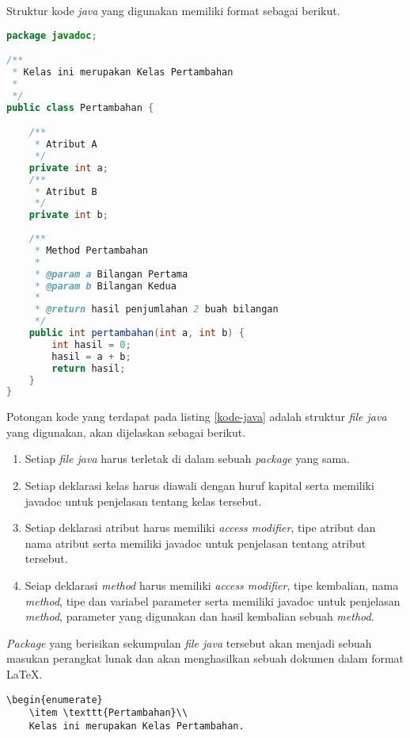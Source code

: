 \documentclass[a4paper,twoside]{article}
\begin{document}
\begin{enumerate}
\begin{enumerate}
Struktur kode {\it java} yang digunakan memiliki format sebagai berikut.

\begin{lstlisting}[language=Java, caption=Potongan kode {\it java}, label={kode-java}]
package javadoc;

/**
 * Kelas ini merupakan Kelas Pertambahan
 *
 */
public class Pertambahan {

    /**
     * Atribut A
     */
    private int a;
    /**
     * Atribut B
     */
    private int b;
    
    /**
     * Method Pertambahan
     *
     * @param a Bilangan Pertama
     * @param b Bilangan Kedua
     * 
     * @return hasil penjumlahan 2 buah bilangan
     */
    public int pertambahan(int a, int b) {
        int hasil = 0;
        hasil = a + b;
        return hasil;
    }
}
\end{lstlisting}

Potongan kode yang terdapat pada listing \ref{kode-java} adalah struktur {\it file java} yang digunakan, akan dijelaskan sebagai berikut.

\begin{enumerate}
	\item Setiap {\it file java} harus terletak di dalam sebuah {\it package} yang sama.
	\item Setiap deklarasi kelas harus diawali dengan huruf kapital serta memiliki javadoc untuk penjelasan tentang kelas tersebut.
	\item Setiap deklarasi atribut harus memiliki {\it access modifier}, tipe atribut dan nama atribut serta memiliki javadoc untuk penjelasan tentang atribut tersebut.
	\item Seiap deklarasi {\it method} harus memiliki {\it access modifier}, tipe kembalian, nama {\it method}, tipe dan variabel parameter serta memiliki javadoc untuk penjelasan {\it method}, parameter yang digunakan dan hasil kembalian sebuah {\it method}.
\end{enumerate}

{\it Package} yang berisikan sekumpulan {\it file java} tersebut akan menjadi sebuah masukan perangkat lunak dan akan menghasilkan sebuah dokumen dalam format \LaTeX.

\begin{lstlisting}[caption=Hasil konversi {\it Javadoc} ke \LaTeX, label={hasil}]
\begin{enumerate}
	\item \texttt{Pertambahan}\\
	Kelas ini merupakan Kelas Pertambahan.
	

\end{lstlisting}
\end{enumerate}
\end{enumerate}
\end{document}
